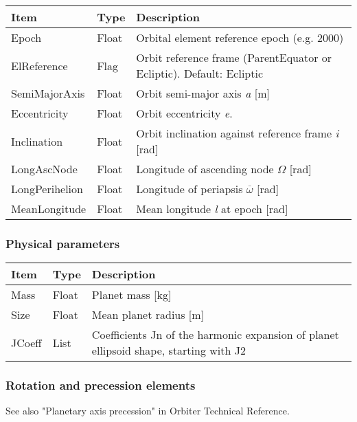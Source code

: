 \documentclass[Orbiter Developer Manual.tex]{subfiles}
\begin{document}
	\begin{longtable}{ |p{}|p{}|p{}| }
	\hline\rule{0pt}{2ex}
	\textbf{Item} & \textbf{Type} & \textbf{Description}\\
	\hline\rule{0pt}{2ex}
	Epoch & Float & Orbital element reference epoch (e.g. 2000)\\
	\hline\rule{0pt}{2ex}
	ElReference & Flag & Orbit reference frame (ParentEquator or Ecliptic). Default: Ecliptic\\
	\hline\rule{0pt}{2ex}
	SemiMajorAxis & Float & Orbit semi-major axis \textit{a} [m]\\
	\hline\rule{0pt}{2ex}
	Eccentricity & Float & Orbit eccentricity \textit{e}.\\
	\hline\rule{0pt}{2ex}
	Inclination & Float & Orbit inclination against reference frame \textit{i} [rad]\\
	\hline\rule{0pt}{2ex}
	LongAscNode & Float & Longitude of ascending node $\Omega$ [rad]\\
	\hline\rule{0pt}{2ex}
	LongPerihelion & Float & Longitude of periapsis $\overline{\omega}$ [rad]\\
	\hline\rule{0pt}{2ex}
	MeanLongitude & Float & Mean longitude \textit{l} at epoch [rad]\\
	\hline
	\end{longtable}


\subsubsection*{Physical parameters}
	\begin{longtable}{ |p{}|p{}|p{}| }
	\hline\rule{0pt}{2ex}
	\textbf{Item} & \textbf{Type} & \textbf{Description}\\
	\hline\rule{0pt}{2ex}
	Mass & Float & Planet mass [kg]\\
	\hline\rule{0pt}{2ex}
	Size & Float & Mean planet radius [m]\\
	\hline\rule{0pt}{2ex}
	JCoeff & List & Coefficients Jn of the harmonic expansion of planet ellipsoid shape, starting with J2\\
	\hline
	\end{longtable}


\subsubsection*{Rotation and precession elements}
See also "Planetary axis precession" in Orbiter Technical Reference.
\end{document}
